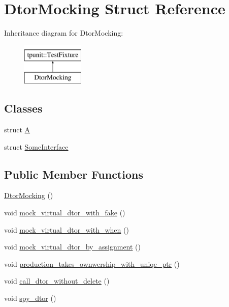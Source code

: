 \hypertarget{structDtorMocking}{}\section{Dtor\+Mocking Struct Reference}
\label{structDtorMocking}
Inheritance diagram for Dtor\+Mocking\+:\begin{figure}[H]
\begin{center}
\leavevmode
\includegraphics[height=2.000000cm]{structDtorMocking}
\end{center}
\end{figure}
\subsection*{Classes}
\begin{DoxyCompactItemize}
\item 
struct \mbox{\hyperlink{structDtorMocking_1_1A}{A}}
\item 
struct \mbox{\hyperlink{structDtorMocking_1_1SomeInterface}{Some\+Interface}}
\end{DoxyCompactItemize}
\subsection*{Public Member Functions}
\begin{DoxyCompactItemize}
\item 
\mbox{\hyperlink{structDtorMocking_a6bda6d6ad4ce8d98c409c2af6dce8513}{Dtor\+Mocking}} ()
\item 
void \mbox{\hyperlink{structDtorMocking_a9f2453dbf88105118fb656c8a98ebc8b}{mock\+\_\+virtual\+\_\+dtor\+\_\+with\+\_\+fake}} ()
\item 
void \mbox{\hyperlink{structDtorMocking_a9e30947bdab9d00e00d037cb1d6e078e}{mock\+\_\+virtual\+\_\+dtor\+\_\+with\+\_\+when}} ()
\item 
void \mbox{\hyperlink{structDtorMocking_ad823effb2cb80e990e1ccf0eeb3d18a9}{mock\+\_\+virtual\+\_\+dtor\+\_\+by\+\_\+assignment}} ()
\item 
void \mbox{\hyperlink{structDtorMocking_a448ae3de91605b0aae900a6816274fc2}{production\+\_\+takes\+\_\+ownwership\+\_\+with\+\_\+uniqe\+\_\+ptr}} ()
\item 
void \mbox{\hyperlink{structDtorMocking_a5292aa3096e015d862a60c9231bea6f7}{call\+\_\+dtor\+\_\+without\+\_\+delete}} ()
\item 
void \mbox{\hyperlink{structDtorMocking_a6ae562cd8a019e7385310a462ae4acc3}{spy\+\_\+dtor}} ()
\end{DoxyCompactItemize}
